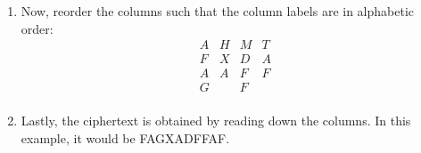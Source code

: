 \documentclass[14pt]{article}
\begin{document}
\begin{enumerate}
\begin{enumerate}
    				\item Now, reorder the columns such that the column labels are in alphabetic order:
    					\[
    						\begin{array}{ccccc}
    							A & H & M & T \\
    							\hline
    							F & X & D & A \\
    							A & A & F & F \\
    							G &   & F &   \\
    						\end{array}
    					\]
    
    				\item Lastly, the ciphertext is obtained by reading down the columns. In this example, it would be FAGXADFFAF.
    			\end{enumerate}
    	\end{enumerate}
        \cite{Trappe}
    
\end{document}
